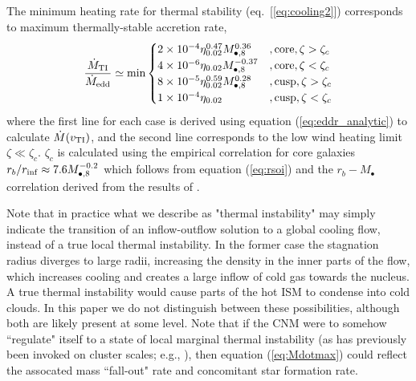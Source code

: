 \documentclass[usenatbib,fleqn]{mn2e}
\begin{document}
The minimum heating rate for thermal stability
(eq.~[\ref{eq:cooling2}]) corresponds to maximum thermally-stable
accretion rate,
\begin{align}
  \frac{\dot{M}_{\rm TI}}{\dot{M}_{\rm edd}} \simeq {\rm
    min}\begin{cases}
    2\times 10^{-4} \eta_{0.02}^{0.47} M_{\bullet,8}^{0.36} &, \text{core}, \zeta > \zeta_c\\
    4\times 10^{-6}\eta_{0.02}M_{\bullet,8}^{-0.37} &, \text{core}, \zeta < \zeta_c \\
    8\times 10^{-5} \eta_{0.02}^{0.59} M_{\bullet,8}^{0.28}    &, \text{cusp}, \zeta > \zeta_c\\
    1\times 10^{-4}\eta_{0.02}&, \text{cusp}, \zeta < \zeta_c
  \end{cases}
  \label{eq:Mdotmax}
\end{align}
where the first line for each case is derived using equation
(\ref{eq:eddr_analytic}) to calculate $\dot{M}(v_{\rm TI})$, and
the second line corresponds to the low wind heating limit $\zeta \ll
\zeta_c$.  $\zeta_c$ is calculated using the empirical correlation for
core galaxies $r_{b}/r_{\rm inf} \approx 7.6M_{\bullet,8}^{-0.2}$ which
follows from equation (\ref{eq:rsoi}) and the $r_b-M_{\bullet}$
correlation derived from the results of \citet{LauerFaber+:2007a}.

Note that in practice  what we describe as "thermal instability" may simply indicate the transition of an inflow-outflow solution to a global cooling flow, instead of a true local thermal instability.  In the former case the stagnation radius diverges to large radii, increasing the density in the inner parts of the flow, which increases cooling and creates a large inflow of cold gas towards the nucleus.  A true thermal instability would cause parts of the hot ISM to condense into cold clouds.  In this paper we do not distinguish between these possibilities, although both are likely present at some level.  Note that if the CNM were to somehow ``regulate" itself to a state of local marginal thermal instability (as has previously been invoked on cluster scales; e.g., \citealt{Voit+15}), then equation (\ref{eq:Mdotmax}) could reflect the assocated mass ``fall-out" rate and concomitant star formation rate.  
\end{document}
